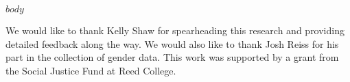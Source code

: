 \documentclass[sigconf]{acmart}
\begin{document}
\maketitle

$body$

\balance




\begin{acks}
We would like to thank Kelly Shaw for spearheading this research and providing detailed feedback along the way. We would also like to thank Josh Reiss for his part in the collection of gender data.
  This work was supported by a grant from the Social Justice Fund at Reed College.
\end{acks}
\end{document}

